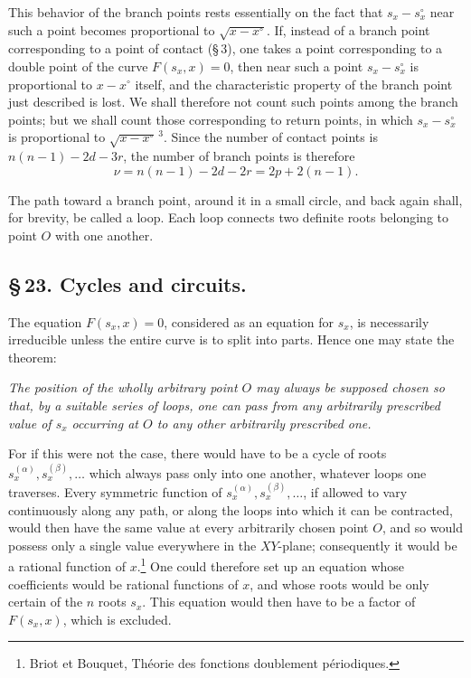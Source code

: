 \documentclass[10pt]{article}
\begin{document}
This behavior of the branch points rests essentially on the fact that \(s_x-s_x^\circ\) near such a point becomes proportional to \(\sqrt{x-x^\circ}\). If, instead of a branch point corresponding to a point of contact (\S\,3), one takes a point corresponding to a double point of the curve \(F(s_x,x)=0\), then near such a point \(s_x-s_x^\circ\) is proportional to \(x-x^\circ\) itself, and the characteristic property of the branch point just described is lost. We shall therefore not count such points among the branch points; but we shall count those corresponding to return points, in which \(s_x-s_x^\circ\) is proportional to \(\sqrt{x-x^\circ}^{\,3}\). Since the number of contact points is \(n(n-1)-2d-3r\), the number of branch points is therefore
\[
\nu=n(n-1)-2d-2r=2p+2(n-1).
\]

The path toward a branch point, around it in a small circle, and back again shall, for brevity, be called a loop. Each loop connects two definite roots belonging to point \(O\) with one another.

\subsection*{\S\,23. Cycles and circuits.}

The equation \(F(s_x,x)=0\), considered as an equation for \(s_x\), is necessarily irreducible unless the entire curve is to split into parts. Hence one may state the theorem:

\emph{The position of the wholly arbitrary point \(O\) may always be supposed chosen so that, by a suitable series of loops, one can pass from any arbitrarily prescribed value of \(s_x\) occurring at \(O\) to any other arbitrarily prescribed one.}

For if this were not the case, there would have to be a cycle of roots \(s_x^{(\alpha)},s_x^{(\beta)},\ldots\) which always pass only into one another, whatever loops one traverses. Every symmetric function of \(s_x^{(\alpha)},s_x^{(\beta)},\ldots\), if allowed to vary continuously along any path, or along the loops into which it can be contracted, would then have the same value at every arbitrarily chosen point \(O\), and so would possess only a single value everywhere in the \(XY\)-plane; consequently it would be a rational function of \(x\).\footnote{Briot et Bouquet, Théorie des fonctions doublement périodiques.} One could therefore set up an equation whose coefficients would be rational functions of \(x\), and whose roots would be only certain of the \(n\) roots \(s_x\). This equation would then have to be a factor of \(F(s_x,x)\), which is excluded.
\end{document}
